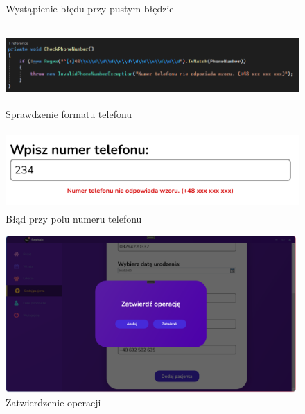 \begin{flushleft}
\begin{figure}[H]
\begin{center}
        \caption{Wystąpienie błędu przy pustym błędzie}
        \label{fig:blad_wpisz_im}
	\end{center}
    \end{figure}
    \begin{figure}[H]
        \begin{center}
	\includegraphics[height=3cm]{images/sprawd_telef.png}
        \caption{Sprawdzenie formatu telefonu}
        \label{fig:sprawd_telef}
	\end{center}
    \end{figure}
    \begin{figure}[H]
        \begin{center}
	\includegraphics[height=3cm]{images/blad_telef.png}
        \caption{Błąd przy polu numeru telefonu}
        \label{fig:blad_telef}
	\end{center}
    \end{figure}
    \begin{figure}[H]
        \begin{center}
	\includegraphics[height=6cm]{images/zatwr_oper_dod.png}
        \caption{Zatwierdzenie operacji}
        \label{fig:zatwr_oper_dod}
	\end{center}
    \end{figure}
    \begin{figure}[H]

\end{figure}
\end{flushleft}
